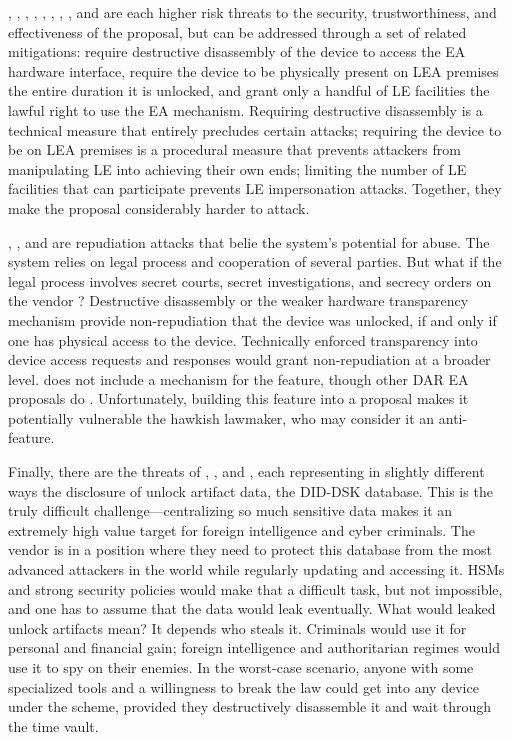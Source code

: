 , , , , , , , , and  are each higher risk threats to the
security, trustworthiness, and effectiveness of the proposal, but can be addressed through a set of related mitigations:
require destructive disassembly of the device to access the \ac{EA} hardware interface, require the device to be
physically present on LEA premises the entire duration it is unlocked, and grant only a handful of LE facilities the
lawful right to use the \ac{EA} mechanism. Requiring destructive disassembly is a technical measure that entirely
precludes certain attacks; requiring the device to be on LEA premises is a procedural measure that prevents attackers
from manipulating LE into achieving their own ends; limiting the number of LE facilities that can participate prevents
LE impersonation attacks. Together, they make the proposal considerably harder to attack.

, , and  are repudiation attacks that belie the system's potential for abuse. The system relies on
legal process and cooperation of several parties. But what if the legal process involves secret courts, secret
investigations, and secrecy orders on the vendor \cite{shamsi_2011}? Destructive disassembly or the weaker hardware
transparency mechanism provide non-repudiation that the device was unlocked, if and only if one has physical access to
the device. Technically enforced transparency into device access requests and responses would grant non-repudiation at a
broader level. \ldawmsr does not include a mechanism for the feature, though other \ac{DAR} \ac{EA} proposals do
\cite{phan_key_2017} \cite{servan_schreiber_jje_2020} \cite{goldwasser_public_2017}. Unfortunately, building this
feature into a proposal makes it potentially vulnerable the hawkish lawmaker, who may consider it an anti-feature.

Finally, there are the threats of , , and , each representing in slightly different ways the
disclosure of unlock artifact data, the DID-DSK database. This is the truly difficult challenge---centralizing so much
sensitive data makes it an extremely high value target for foreign intelligence and cyber criminals. The vendor is in a
position where they need to protect this database from the most advanced attackers in the world while regularly updating
and accessing it. \Acp{HSM} and strong security policies would make that a difficult task, but not impossible, and one
has to assume that the data would leak eventually. What would leaked unlock artifacts mean? It depends who steals it.
Criminals would use it for personal and financial gain; foreign intelligence and authoritarian regimes would use it to
spy on their enemies. In the worst-case scenario, anyone with some specialized tools and a willingness to break the law
could get into any device under the scheme, provided they destructively disassemble it and wait through the time vault.


